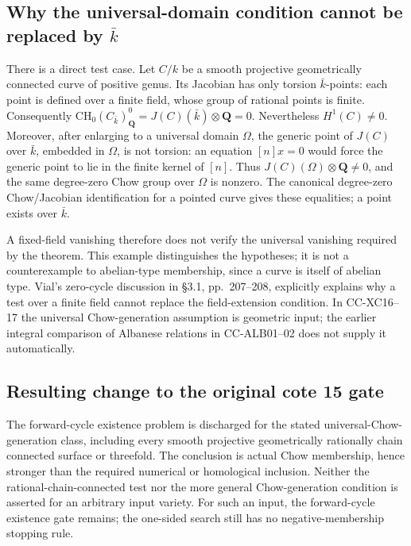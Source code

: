 \subsection{\texorpdfstring{Why the universal-domain condition cannot be
replaced by
\(\bar k\)}{Why the universal-domain condition cannot be replaced by \textbackslash bar k}}\label{why-the-universal-domain-condition-cannot-be-replaced-by-bar-k}

There is a direct test case. Let \(C/k\) be a smooth projective
geometrically connected curve of positive genus. Its Jacobian has only
torsion \(\bar k\)-points: each point is defined over a finite field,
whose group of rational points is finite. Consequently
\(\mathrm{CH}_0(C_{\bar k})_{\mathbf Q}^0=J(C)(\bar k)\otimes\mathbf Q=0\).
Nevertheless \(H^1(C)\ne0\). Moreover, after enlarging to a universal
domain \(\Omega\), the generic point of \(J(C)\) over \(\bar k\),
embedded in \(\Omega\), is not torsion: an equation \([n]x=0\) would
force the generic point to lie in the finite kernel of \([n]\). Thus
\(J(C)(\Omega)\otimes\mathbf Q\ne0\), and the same degree-zero Chow
group over \(\Omega\) is nonzero. The canonical degree-zero
Chow/Jacobian identification for a pointed curve gives these equalities;
a point exists over \(\bar k\).

A fixed-field vanishing therefore does not verify the universal
vanishing required by the theorem. This example distinguishes the
hypotheses; it is not a counterexample to abelian-type membership, since
a curve is itself of abelian type. Vial's zero-cycle discussion in §3.1,
pp.~207--208, explicitly explains why a test over a finite field cannot
replace the field-extension condition. In CC-XC16--17 the universal
Chow-generation assumption is geometric input; the earlier integral
comparison of Albanese relations in CC-ALB01--02 does not supply it
automatically.

\subsection{Resulting change to the original cote 15
gate}\label{resulting-change-to-the-original-cote-15-gate}

The forward-cycle existence problem is discharged for the stated
universal-Chow-generation class, including every smooth projective
geometrically rationally chain connected surface or threefold. The
conclusion is actual Chow membership, hence stronger than the required
numerical or homological inclusion. Neither the rational-chain-connected
test nor the more general Chow-generation condition is asserted for an
arbitrary input variety. For such an input, the forward-cycle existence
gate remains; the one-sided search still has no negative-membership
stopping rule.

